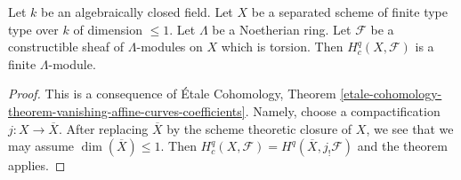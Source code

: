 \begin{lemma}
\label{lemma-finiteness-curves}
Let $k$ be an algebraically closed field. Let $X$ be a separated
scheme of finite type type over $k$ of dimension $\leq 1$.
Let $\Lambda$ be a Noetherian ring.
Let $\mathcal{F}$ be a constructible sheaf of $\Lambda$-modules
on $X$ which is torsion. Then $H^q_c(X, \mathcal{F})$ is a
finite $\Lambda$-module.
\end{lemma}

\begin{proof}
This is a consequence of \'Etale Cohomology, Theorem
\ref{etale-cohomology-theorem-vanishing-affine-curves-coefficients}.
Namely, choose a compactification $j : X \to \overline{X}$.
After replacing $\overline{X}$ by the scheme theoretic closure
of $X$, we see that we may assume $\dim(\overline{X}) \leq 1$.
Then $H^q_c(X, \mathcal{F}) = H^q(\overline{X}, j_!\mathcal{F})$
and the theorem applies.
\end{proof}

